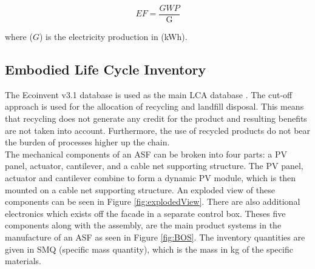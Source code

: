 \begin{description}
\begin{equation}
EF=\frac{GWP}{\mathrm{G}}
\label{eq:EF}
\end{equation}

where ($G$) is the electricity production in (kWh).



\end{description}


\subsection{Embodied Life Cycle Inventory}

The Ecoinvent v3.1 database is used as the main LCA database \cite{frischknecht2005ecoinvent}. The cut-off approach is used for the allocation of recycling and landfill disposal. This means that recycling does not generate any credit for the product and resulting benefits are not taken into account. Furthermore, the use of recycled products do not bear the burden of processes higher up the chain.\\

The mechanical components of an ASF can be broken into four parts: a PV panel, actuator, cantilever, and a cable net supporting structure. The PV panel, actuator and cantilever combine to form a dynamic PV module, which is then mounted on a cable net supporting structure. An exploded view of these components can be seen in Figure \ref{fig:explodedView}. There are also additional electronics which exists off the facade in a separate control box. Theses five components along with the assembly, are the main product systems in the manufacture of an ASF as seen in Figure \ref{fig:BOS}. The inventory quantities are given in SMQ (specific mass quantity), which is the mass in kg of the specific materials.

